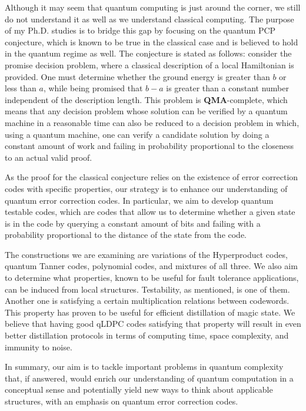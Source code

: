 \documentclass[11pt, oneside]{book}
\begin{document}
Although it may seem that quantum computing is just around the corner, we still do not understand it as well as we understand classical computing. The purpose of my Ph.D. studies is to bridge this gap by focusing on the quantum PCP conjecture, which is known to be true in the classical case and is believed to hold in the quantum regime as well. The conjecture is stated as follows: consider the promise decision problem, where a classical description of a local Hamiltonian is provided. One must determine whether the ground energy is greater than $b$ or less than $a$, while being promised that $b-a$ is greater than a constant number independent of the description length. This problem is \textbf{QMA}-complete, which means that any decision problem whose solution can be verified by a quantum machine in a reasonable time can also be reduced to a decision problem in which, using a quantum machine, one can verify a candidate solution by doing a constant amount of work and failing in probability proportional to the closeness to an actual valid proof.

As the proof for the classical conjecture relies on the existence of error correction codes with specific properties, our strategy is to enhance our understanding of quantum error correction codes. In particular, we aim to develop quantum testable codes, which are codes that allow us to determine whether a given state is in the code by querying a constant amount of bits and failing with a probability proportional to the distance of the state from the code. 

The constructions we are examining are variations of the Hyperproduct codes, quantum Tanner codes, polynomial codes, and mixtures of all three. We also aim to determine what properties, known to be useful for fault tolerance applications, can be induced from local structures. Testability, as mentioned, is one of them. Another one is satisfying a certain multiplication relations between codewords. This property has proven to be useful for efficient distillation of magic state. We believe that having good qLDPC codes satisfying that property will result in even better distillation protocols in terms of computing time, space complexity, and immunity to noise.
 
In summary, our aim is to tackle important problems in quantum complexity that, if answered, would enrich our understanding of quantum computation in a conceptual sense and potentially yield new ways to think about applicable structures, with an emphasis on quantum error correction codes.
\end{document}
